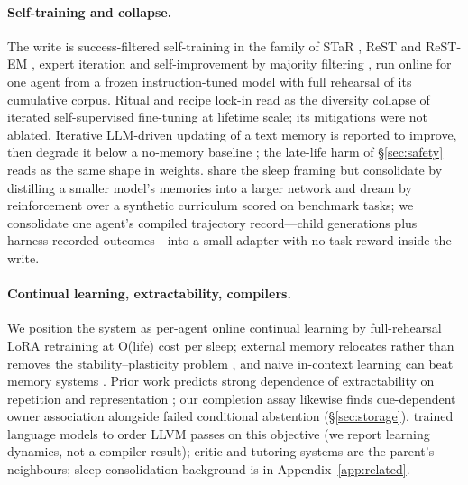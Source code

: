 \documentclass{article}
\begin{document}
\paragraph{Self-training and collapse.} The write is success-filtered self-training in the family of STaR \citep{zelikman2022star}, ReST and ReST-EM \citep{gulcehre2023rest,singh2023restem}, expert iteration \citep{anthony2017expert} and self-improvement by majority filtering \citep{huang2022lmsi}, run online for one agent from a frozen instruction-tuned model with full rehearsal of its cumulative corpus. Ritual and recipe lock-in read as the diversity collapse of iterated self-supervised fine-tuning \citep{shumailov2024collapse,alemohammad2023mad} at lifetime scale; its mitigations were not ablated. Iterative LLM-driven updating of a text memory is reported to improve, then degrade it below a no-memory baseline \citep{zhang2026faultymemories}; the late-life harm of \S\ref{sec:safety} reads as the same shape in weights. \citet{behrouz2026sleep} share the sleep framing but consolidate by distilling a smaller model's memories into a larger network and dream by reinforcement over a synthetic curriculum scored on benchmark tasks; we consolidate one agent's compiled trajectory record---child generations plus harness-recorded outcomes---into a small adapter with no task reward inside the write.

\paragraph{Continual learning, extractability, compilers.} We position the system as per-agent online continual learning by full-rehearsal LoRA retraining at O(life) cost per sleep; external memory relocates rather than removes the stability--plasticity problem \citep{hu2026whencl}, and naive in-context learning can beat memory systems \citep{asawa2026clbench}. Prior work predicts strong dependence of extractability on repetition and representation \citep{allenzhu2023physics,park2025newnews}; our completion assay likewise finds cue-dependent owner association alongside failed conditional abstention (\S\ref{sec:storage}). \citet{cummins2023llmcompiler} trained language models to order LLVM passes on this objective (we report learning dynamics, not a compiler result); critic and tutoring systems \citep{madaan2023selfrefine,gou2023critic} are the parent's neighbours; sleep-consolidation background is in Appendix~\ref{app:related}.
\end{document}
